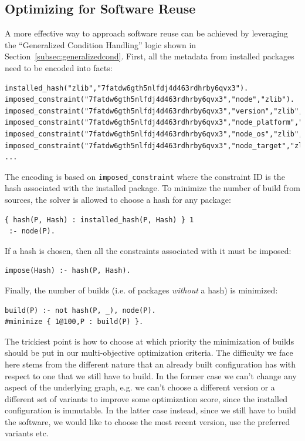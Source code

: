 \subsection{Optimizing for Software Reuse}
A more effective way to approach software reuse can be achieved by leveraging the ``Generalized Condition Handling'' logic shown in Section~\ref{subsec:generalizedcond}. 
First, all the metadata from installed packages need to be encoded into facts:
\begin{verbatim}
installed_hash("zlib","7fatdw6gth5nlfdj4d463rdhrby6qvx3").
imposed_constraint("7fatdw6gth5nlfdj4d463rdhrby6qvx3","node","zlib").
imposed_constraint("7fatdw6gth5nlfdj4d463rdhrby6qvx3","version","zlib","1.2.11").
imposed_constraint("7fatdw6gth5nlfdj4d463rdhrby6qvx3","node_platform","zlib","linux").
imposed_constraint("7fatdw6gth5nlfdj4d463rdhrby6qvx3","node_os","zlib","ubuntu20.04").
imposed_constraint("7fatdw6gth5nlfdj4d463rdhrby6qvx3","node_target","zlib","icelake").
...
\end{verbatim}
The encoding is based on \texttt{imposed\_constraint} where the constraint ID is the hash associated with the installed package.
To minimize the number of build from sources, the solver is allowed to choose a hash for any package:
\begin{verbatim}
{ hash(P, Hash) : installed_hash(P, Hash) } 1
 :- node(P).
\end{verbatim}
If a hash is chosen, then all the constraints associated with it must be imposed:
\begin{verbatim}
impose(Hash) :- hash(P, Hash).
\end{verbatim}
Finally, the number of builds (i.e. of packages \emph{without} a hash) is minimized:
\begin{verbatim}
build(P) :- not hash(P, _), node(P).
#minimize { 1@100,P : build(P) }.
\end{verbatim}

The trickiest point is how to choose at which priority the minimization of builds should be put in our multi-objective optimization criteria. The difficulty we face here stems from the different nature that an already built configuration has with respect to one that we still have to build. In the former case we can't change any aspect of the underlying graph, e.g. we can't choose a different version or a different set of variants to improve some optimization score, since the installed configuration is immutable. In the latter case instead, since we still have to build the software, we would like to choose the most recent version, use the preferred variants etc. 

